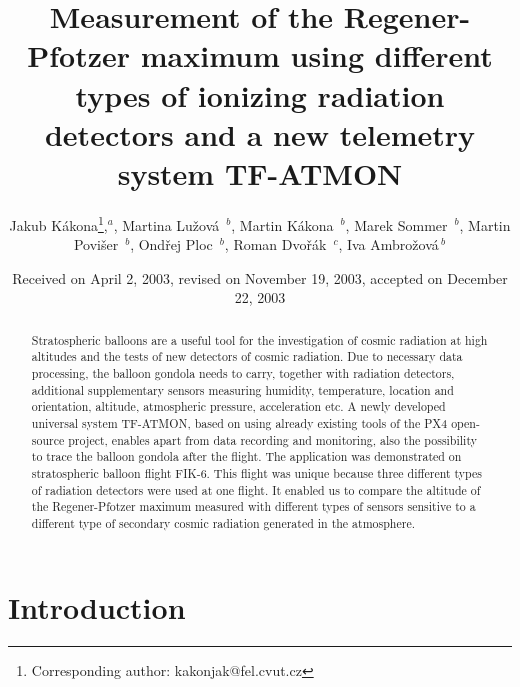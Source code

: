 \documentclass{Rpd}
\begin{document}

\def\copyrightyear{2021}%

\title[TF-ATMON ionizing radiation measurement]{Measurement of the Regener-Pfotzer maximum using different types of ionizing radiation detectors and a new telemetry system TF-ATMON}
\author[Kakona J. \textit{et~al}]{Jakub Kákona\footnote{Corresponding author: kakonjak@fel.cvut.cz},$^{ a}$,  Martina Lužová \,$^{ b}$, Martin Kákona \,$^{ b}$, Marek Sommer \,$^{ b}$, Martin Povišer \,$^{ b}$, Ondřej Ploc \,$^{ b}$, Roman Dvořák \,$^{ c}$, Iva Ambrožová\,$^{ b}$}
\address{$^{ a}$Czech Technical University in Prague, Faculty of Electrical Engineering, Prague, Czech Republic, $^{ b}$Department of Radiation Dosimetry, Nuclear Physics Institute of the CAS, Na Truhlářce 39/64, 180 00, Prague 8, Czech Republic, $^{ c}$ ThunderFly s.r.o., U Jatek 19, Soběslav  392 01, Czech Republic}

\date{Received on April 2, 2003, revised on November 19, 2003, accepted on December 22, 2003}

\begin{abstract}
Stratospheric balloons are a useful tool for the investigation of cosmic radiation at high altitudes and the tests of new detectors of cosmic radiation. Due to necessary data processing, the balloon gondola needs to carry, together with radiation detectors, additional supplementary sensors measuring humidity, temperature, location and orientation, altitude, atmospheric pressure, acceleration etc. A newly developed universal system TF-ATMON, based on using already existing tools of the PX4 open-source project, enables apart from data recording and monitoring, also the possibility to trace the balloon gondola after the flight. The application was demonstrated on stratospheric balloon flight FIK-6. This flight was unique because three different types of radiation detectors were used at one flight. It enabled us to compare the altitude of the Regener-Pfotzer maximum measured with different types of sensors sensitive to a different type of secondary cosmic radiation generated in the atmosphere.
\end{abstract}

\maketitle


\section{Introduction}
\end{document}
